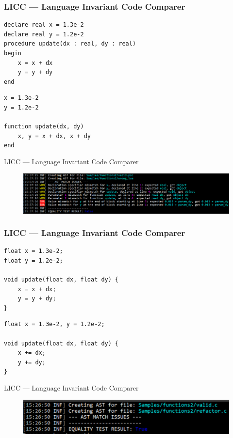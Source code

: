 \documentclass{beamer}
\begin{document}
\begin{frame}[fragile]
    \frametitle{LICC --- Language Invariant Code Comparer}
\begin{lstlisting}
declare real x = 1.3e-2
declare real y = 1.2e-2
procedure update(dx : real, dy : real)
begin
    x = x + dx
    y = y + dy
end
\end{lstlisting}
\begin{lstlisting}
x = 1.3e-2
y = 1.2e-2

function update(dx, dy)
    x, y = x + dx, x + dy
end
\end{lstlisting}
\end{frame}

\begin{frame}{LICC --- Language Invariant Code Comparer}
    \begin{figure}[h!]
        \centering
        \includegraphics[scale=0.55]{images/eval/fparams_valid_wrong.PNG}
    \end{figure}
\end{frame}

\begin{frame}[fragile]
    \frametitle{LICC --- Language Invariant Code Comparer}
\begin{lstlisting}
float x = 1.3e-2; 
float y = 1.2e-2;

void update(float dx, float dy) {
    x = x + dx; 
    y = y + dy;
}
\end{lstlisting}
\begin{lstlisting}
float x = 1.3e-2, y = 1.2e-2;

void update(float dx, float dy) {
    x += dx;
    y += dy;
}
\end{lstlisting}
\end{frame}

\begin{frame}{LICC --- Language Invariant Code Comparer}
    \begin{figure}[h!]
        \centering
        \includegraphics[scale=0.58]{images/eval/fparams_valid_refactor.PNG}
    \end{figure}
\end{frame}
\end{document}
